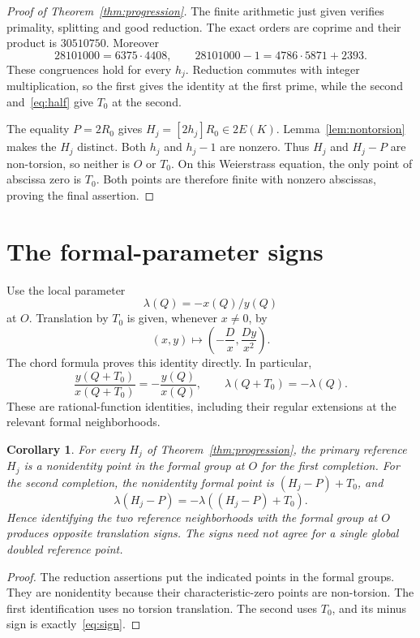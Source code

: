 \documentclass[11pt,a4paper]{article}
\newtheorem{corollary}[theorem]{Corollary}
\begin{document}
\begin{proof}[Proof of Theorem~\ref{thm:progression}]
The finite arithmetic just given verifies primality, splitting and good
reduction. The exact orders are coprime and their product is
$30510750$. Moreover
\[
 28101000=6375\cdot4408,\qquad
 28101000-1=4786\cdot5871+2393.
\]
These congruences hold for every $h_j$. Reduction commutes with
integer multiplication, so the first gives the identity at the first
prime, while the second and~\eqref{eq:half} give $T_0$ at the second.

The equality $P=2R_0$ gives $H_j=[2h_j]R_0\in2E(K)$.
Lemma~\ref{lem:nontorsion} makes the $H_j$ distinct.
Both $h_j$ and $h_j-1$ are nonzero. Thus $H_j$ and $H_j-P$ are
non-torsion, so neither is $O$ or $T_0$. On this Weierstrass equation,
the only point of abscissa zero is $T_0$. Both points are therefore
finite with nonzero abscissas, proving the final assertion.
\end{proof}

\section{The formal-parameter signs}
Use the local parameter
\[
                         \lambda(Q)=-x(Q)/y(Q)
\]
at $O$. Translation by $T_0$ is given, whenever $x\ne0$, by
\begin{equation}\label{eq:translation}
 (x,y)\longmapsto
       \left(-\frac D x,\frac{Dy}{x^2}\right).
\end{equation}
The chord formula proves this identity directly. In particular,
\begin{equation}\label{eq:sign}
 \frac{y(Q+T_0)}{x(Q+T_0)}=-\frac{y(Q)}{x(Q)},
 \qquad
                         \lambda(Q+T_0)=-\lambda(Q).
\end{equation}
These are rational-function identities, including their regular
extensions at the relevant formal neighborhoods.

\begin{corollary}\label{cor:signs}
For every $H_j$ of Theorem~\ref{thm:progression}, the primary reference
$H_j$ is a nonidentity point in the formal group at $O$ for the first
completion. For the second completion, the nonidentity formal point
is $(H_j-P)+T_0$, and
\[
             \lambda(H_j-P)=-\lambda((H_j-P)+T_0).
\]
Hence identifying the two reference neighborhoods with the formal group
at $O$ produces opposite translation signs. The signs need not agree
for a single global doubled reference point.
\end{corollary}
\begin{proof}
The reduction assertions put the indicated points in the formal groups.
They are nonidentity because their characteristic-zero points are
non-torsion. The first identification uses no torsion translation.
The second uses $T_0$, and its minus sign is exactly~\eqref{eq:sign}.
\end{proof}
\end{document}
